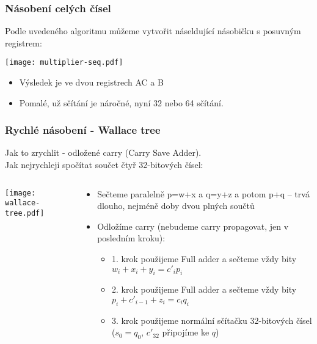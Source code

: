 \documentclass{beamer}
\begin{document}
\begin{frame}
\frametitle{Násobení celých čísel}

Podle uvedeného algoritmu můžeme vytvořit náseldující násobičku s posuvným registrem:
\begin{center}
\texttt{[image: multiplier-seq.pdf]}
\end{center}
\begin{itemize}
\item Výsledek je ve dvou registrech AC a B
\item Pomalé, už sčítání je náročné, nyní 32 nebo 64 sčítání.
\end{itemize}
\end{frame}


\begin{frame}
\frametitle{Rychlé násobení - Wallace tree}

Jak to zrychlit - odložené carry (Carry Save Adder).\\
Jak nejrychleji spočítat součet čtyř 32-bitových čísel:\\
\begin{columns}
\begin{column}{0.35\textwidth}
\texttt{[image: wallace-tree.pdf]}
\end{column}
\hfill
\begin{column}{0.65\textwidth}
\begin{itemize}
\item Sečteme paralelně p=w+x a q=y+z a potom p+q -- trvá dlouho, nejméně doby dvou plných součtů
\item Odložíme carry (nebudeme carry propagovat, jen v posledním kroku):
\begin{itemize}
\item 1. krok použijeme Full adder a sečteme vždy bity $w_i+x_i+y_i = c'_ip_i$
\item 2. krok použijeme Full adder a sečteme vždy bity $p_i+c'_{i-1}+z_i = c_iq_i$
\item 3. krok použijeme normální sčítačku 32-bitových čísel ($s_0=q_0$, $c'_32$ připojíme ke $q$)
\end{itemize}
\end{itemize}
\end{column}
\end{columns}
\end{frame}
\end{document}
